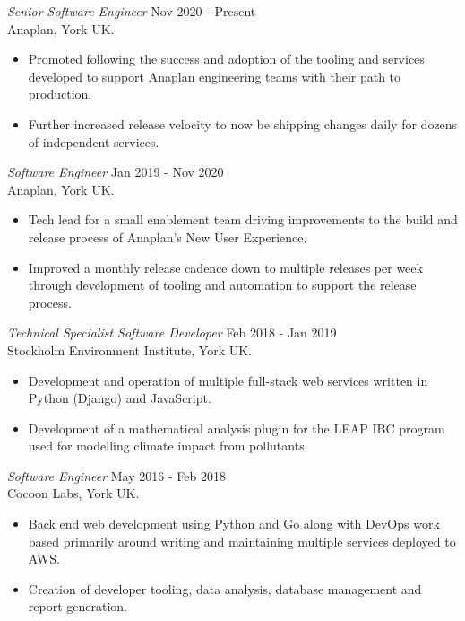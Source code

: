 \documentclass[margin]{res}
\begin{document}
\begin{resume}
{\sl Senior Software Engineer} \hfill Nov 2020 - Present  \\
Anaplan, York UK.
\begin{itemize}  \itemsep -2pt %
  \item Promoted following the success and adoption of the tooling and
        services developed to support Anaplan engineering teams with
        their path to production.
  \item Further increased release velocity to now be shipping changes
        daily for dozens of independent services.
\end{itemize}

{\sl Software Engineer} \hfill Jan 2019 - Nov 2020 \\
Anaplan, York UK.
\begin{itemize}  \itemsep -2pt %
  \item Tech lead for a small enablement team driving improvements to
        the build and release process of Anaplan's New User Experience.
  \item Improved a monthly release cadence down to multiple releases per
        week through development of tooling and automation to support the
        release process.
\end{itemize}

{\sl Technical Specialist Software Developer} \hfill Feb 2018 - Jan 2019 \\
Stockholm Environment Institute, York UK.
\begin{itemize}  \itemsep -2pt %
  \item Development and operation of multiple full-stack web services written
        in Python (Django) and JavaScript.
  \item Development of a mathematical analysis plugin for the LEAP IBC program
        used for modelling climate impact from pollutants.
\end{itemize}

{\sl Software Engineer} \hfill May 2016 - Feb 2018 \\
Cocoon Labs, York UK.
\begin{itemize}  \itemsep -2pt %
  \item Back end web development using Python and Go along with DevOps work based
        primarily around writing and maintaining multiple services deployed to AWS.
  \item Creation of developer tooling, data analysis, database management and
        report generation.
\end{itemize}




\end{resume}
\end{document}
